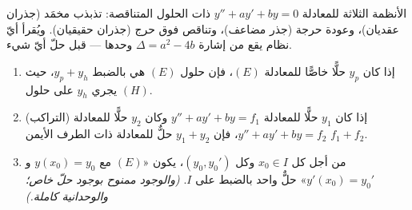\begin{omfigure}

{\small الأنظمة الثلاثة للمعادلة $y'' + ay' + by = 0$ ذات الحلول
المتناقصة: تذبذب مخمَد (جذران عقديان)، وعودة حرجة
(جذر مضاعف)، وتناقص فوق حرج (جذران حقيقيان). ويُقرأ أيّ نظام
يقع من إشارة $\Delta = a^2 - 4b$ وحدها ---
قبل حلّ أيّ شيء.}
\end{omfigure}

\begin{theorem}\label{thm:b1:diffeq:structure2}
\begin{enumerate}
  \item إذا كان $y_p$ حلًّا خاصًّا للمعادلة $(E)$، فإن حلول
        $(E)$ هي بالضبط $y_p + y_h$، حيث يجري $y_h$ على
        حلول $(H)$.
  \item (التراكب) إذا كان $y_1$ حلًّا للمعادلة $y'' + ay' + by = f_1$ وكان
        $y_2$ حلًّا للمعادلة $y'' + ay' + by = f_2$، فإن $y_1 + y_2$ حلٌّ
        للمعادلة ذات الطرف الأيمن $f_1 + f_2$.
  \item من أجل كل $x_0 \in I$ وكل $(y_0, y_0')$، يكون 
        «$(E)$ مع $y(x_0) = y_0$ و $y'(x_0) = y_0'$» حلٌّ واحد
        بالضبط على $I$. \emph{(والوجود ممنوح بوجود حلّ
        خاص؛ والوحدانية كاملة.)}
\end{enumerate}
\end{theorem}

